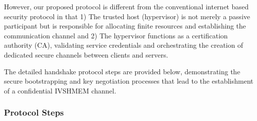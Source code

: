 \documentclass[letterpaper,twocolumn,10pt]{article}
\begin{document}
However, our proposed protocol is different from the conventional internet based security protocol in that 1) The trusted host (hypervisor) is not merely a passive participant but is responsible for allocating finite resources and establishing the communication channel  and 2) The hypervisor functions as a certification authority (CA), validating service credentials and orchestrating the creation of dedicated secure channels between clients and servers. 

The detailed handshake protocol steps are provided below, demonstrating the secure bootstrapping and key negotiation processes that lead to the establishment of a confidential IVSHMEM channel.






\subsubsection{Protocol Steps}
\end{document}

